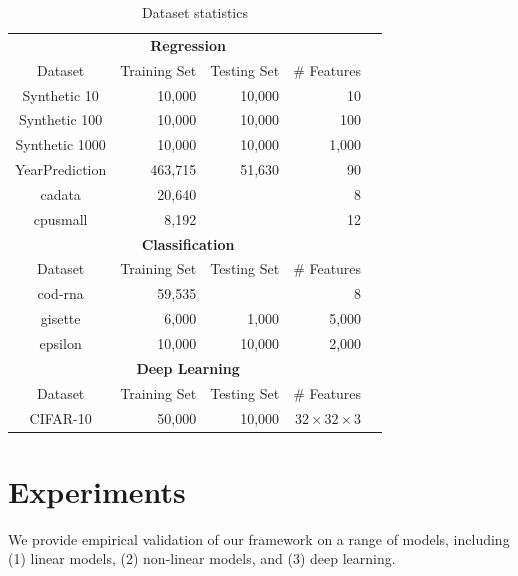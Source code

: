 \documentclass{article}
\begin{document}
\begin{table}[t]
\scriptsize
\centering
\begin{tabular}{crrrr}
\hline
\multicolumn{4}{c}{\bf Regression}\\
Dataset           & Training Set & Testing Set & \# Features  \\
\hline
Synthetic 10   & 10,000        & 10,000       & 10               \\
Synthetic 100  & 10,000        & 10,000       & 100              \\
Synthetic 1000 & 10,000        & 10,000       & 1,000           \\
YearPrediction & 463,715       & 51,630       & 90                  \\
cadata         & 20,640        &              & 8                   \\
cpusmall       & 8,192         &              & 12     \\
\hline
\hline
\multicolumn{4}{c}{\bf Classification}\\
Dataset           & Training Set & Testing Set & \# Features \\
\hline
cod-rna        & 59,535        &              & 8    \\
gisette        & 6,000         & 1,000        & 5,000  \\  
epsilon        & 10,000        & 10,000       & 2,000\\  
\hline
\hline
\multicolumn{4}{c}{\bf Deep Learning}\\
Dataset           & Training Set & Testing Set & \# Features \\
\hline
CIFAR-10        & 50,000        & 10,000             &$32\times 32\times 3$     \\
\hline
\end{tabular}
\caption{Dataset statistics}
\label{table:dataset}
\end{table}

\vspace{-0.5em}
\section{Experiments} \label{sec:exp}

\vspace{-0.5em}
We provide empirical validation of
our framework on a range of
models, including
(1) linear models, (2) non-linear models,
and (3) deep learning.

\vspace{-1em}
\end{document}
